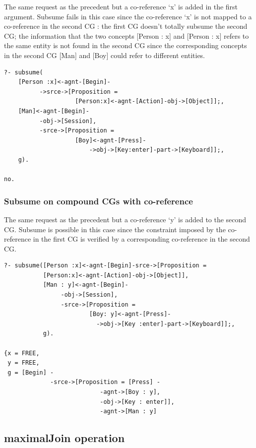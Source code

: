 \documentclass{book}
\begin{document}
The same request as the precedent but a co-reference `x' is added
in the first argument. Subsume fails in this case since the
co-reference `x' is not mapped to a co-reference in the second CG :
the first CG doesn't totally subsume the second CG; the information
that the two concepts [Person : x] and [Person : x] refers to the same
entity is not found in the second CG since the corresponding concepts
in the second CG [Man] and [Boy] could refer to different
entities.


\begin{verbatim}
?- subsume(
    [Person :x]<-agnt-[Begin]-
          ->srce->[Proposition = 
                    [Person:x]<-agnt-[Action]-obj->[Object]];,
    [Man]<-agnt-[Begin]-
          -obj->[Session],
          -srce->[Proposition =
                    [Boy]<-agnt-[Press]-
                        ->obj->[Key:enter]-part->[Keyboard]];,
    g).

no.
\end{verbatim}






\subsubsection{Subsume on compound CGs with co-reference}

The same request as the precedent but a co-reference `y' is added
to the second CG. Subsume is possible in this case since the
constraint imposed by the co-reference in the first CG is verified by
a corresponding co-reference in the second CG.


\begin{verbatim}
?- subsume([Person :x]<-agnt-[Begin]-srce->[Proposition =
           [Person:x]<-agnt-[Action]-obj->[Object]],
           [Man : y]<-agnt-[Begin]-
                -obj->[Session],
                -srce->[Proposition =
                        [Boy: y]<-agnt-[Press]-
                          ->obj->[Key :enter]-part->[Keyboard]];, 
           g).

{x = FREE, 
 y = FREE, 
 g = [Begin] -
             -srce->[Proposition = [Press] -
                           -agnt->[Boy : y],
                           -obj->[Key : enter]],
                           -agnt->[Man : y]
\end{verbatim}






\subsection{maximalJoin operation}
\end{document}
